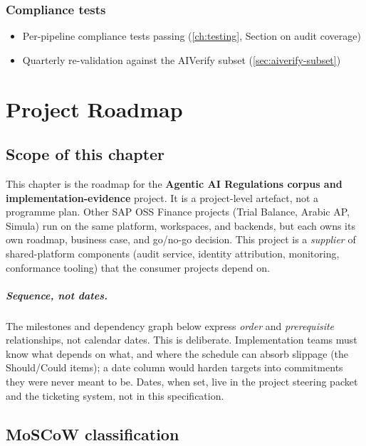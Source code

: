 \documentclass[11pt,a4paper,twoside]{report}
\begin{document}
\subsection{Compliance tests}

\begin{itemize}
\item[\texttt{[ ]}] Per-pipeline compliance tests passing
(\cref{ch:testing}, Section on audit coverage)
\item[\texttt{[ ]}] Quarterly re-validation against the
AIVerify subset (\cref{sec:aiverify-subset})
\end{itemize}
\chapter{Project Roadmap}\label{ch:reg-roadmap}

\section*{Scope of this chapter}

This chapter is the roadmap for the \textbf{Agentic AI Regulations
corpus and implementation-evidence} project. It is a project-level
artefact, not a programme plan. Other SAP OSS Finance projects (Trial
Balance, Arabic AP, Simula) run on the same platform, workspaces, and
backends, but each owns its own roadmap, business case, and go/no-go
decision. This project is a \emph{supplier} of shared-platform
components (audit service, identity attribution, monitoring,
conformance tooling) that the consumer projects depend on.

\paragraph{Sequence, not dates.}
The milestones and dependency graph below express \emph{order} and
\emph{prerequisite} relationships, not calendar dates. This is
deliberate. Implementation teams must know what depends on what, and
where the schedule can absorb slippage (the Should/Could items); a
date column would harden targets into commitments they were never
meant to be. Dates, when set, live in the project steering packet and
the ticketing system, not in this specification.

\section{MoSCoW classification}\label{sec:reg-moscow}
\end{document}
